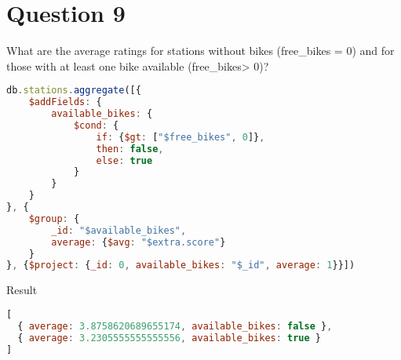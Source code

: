 \section{Question 9}

\begin{question}
  What are the average ratings for stations without bikes (free\_bikes = 0)
  and for those with at least one bike available (free\_bikes> 0)?
\end{question}

\begin{answer}

  \begin{lstlisting}[language=js]
db.stations.aggregate([{
    $addFields: {
        available_bikes: {
            $cond: {
                if: {$gt: ["$free_bikes", 0]},
                then: false,
                else: true
            }
        }
    }
}, {
    $group: {
        _id: "$available_bikes",
        average: {$avg: "$extra.score"}
    }
}, {$project: {_id: 0, available_bikes: "$_id", average: 1}}])
  \end{lstlisting}
  \pagebreak
  Result
  \begin{lstlisting}[language=js]
[
  { average: 3.8758620689655174, available_bikes: false },
  { average: 3.2305555555555556, available_bikes: true }
]
  \end{lstlisting}

\end{answer}
